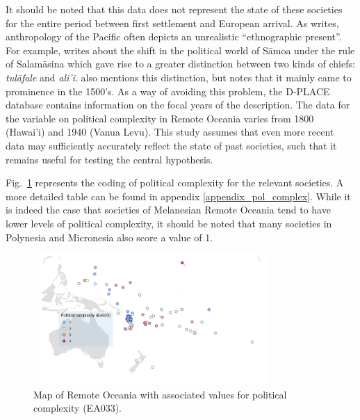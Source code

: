 \documentclass[unnumsec,webpdf,modern,medium]{oup-authoring-template}
\begin{document}
\begin{appendices}


It should be noted that this data does not represent the state of these societies for the entire period between first settlement and European arrival. As \citet{meleisea1995} writes, anthropology of the Pacific often depicts an unrealistic ``ethnographic present''. For example, \citet[185]{schoeffel87} writes about the shift in the political world of S\={a}moa under the rule of Salam\={a}sina which gave rise to a greater distinction between two kinds of chiefs: \emph{tul\={a}fale} and \emph{ali'i}. \citet[249]{kirch2017road} also mentions this distinction, but notes that it mainly came to prominence in the 1500's. As a way of avoiding this problem, the D-PLACE database \citep{d_place_all} contains information on the focal years of the description. The data for the variable on political complexity in Remote Oceania varies from 1800 (Hawai'i) and 1940 (Vanua Levu). This study assumes that even more recent data may sufficiently accurately reflect the state of past societies, such that it remains useful for testing the central hypothesis.

Fig.~\ref{pol_complex_map} represents the coding of political complexity for the relevant societies. A more detailed table can be found in appendix \ref{appendix_pol_complex}. While it is indeed the case that societies of Melanesian Remote Oceania tend to have lower levels of political complexity, it should be noted that many societies in Polynesia and Micronesia also score a value of 1.

\begin{figure}
\centering
\includegraphics[width=0.8\textwidth]{map_pol_complex.png}
\caption[Map of Remote Oceania: Political complexity]{{Map of Remote Oceania with associated values for political complexity (EA033).}}
\label{pol_complex_map}
\end{figure}


\end{appendices}
\end{document}

